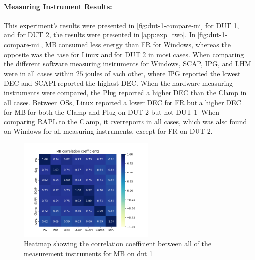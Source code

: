 

\paragraph{Measuring Instrument Results:} %
This experiment's results were presented in \cref{fig:dut-1-compare-mi} for DUT 1, and for DUT 2, the results were presented in \cref{app:exp_two}. In \cref{fig:dut-1-compare-mi}, MB consumed less energy than FR for Windows, whereas the opposite was the case for Linux and for DUT 2 in most cases. When comparing the different software measuring instruments for Windows, SCAP, IPG, and LHM were in all cases within $25$ joules of each other, where IPG reported the lowest DEC and SCAPI reported the highest DEC. When the hardware measuring instruments were compared, the Plug reported a higher DEC than the Clamp in all cases. Between OSs, Linux reported a lower DEC for FR but a higher DEC for MB for both the Clamp and Plug on DUT 2 but not DUT 1. When comparing RAPL to the Clamp, it overreports in all cases, which was also found on Windows for all measuring instruments, except for FR on DUT 2.

\begin{figure}[H]
    \centering
    \hspace*{-1cm} %
    \includegraphics[width=0.6\textwidth]{figures/MandelbrotDut1.png}
    \caption{Heatmap showing the correlation coefficient between all of the measurement instruments for MB on dut 1}
    \label{fig:mandelCorrDut1}
\end{figure}

